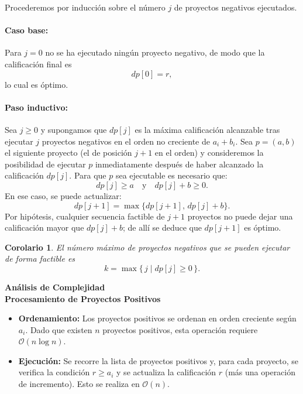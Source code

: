 ﻿\documentclass{article}
\theoremstyle{plain}
\newtheorem{corollary}{Corolario}
\theoremstyle{definition}
\begin{document}
Procederemos por inducción sobre el número \(j\) de proyectos negativos ejecutados.

\paragraph{Caso base:} Para \(j=0\) no se ha ejecutado ningún proyecto negativo, de modo que la calificación final es
\[
dp[0] = r,
\]
lo cual es óptimo.

\paragraph{Paso inductivo:} Sea \(j \ge 0\) y supongamos que \(dp[j]\) es la máxima calificación alcanzable tras ejecutar \(j\) proyectos negativos en el orden no creciente de \(a_i+b_i\). Sea \(p=(a,b)\) el siguiente proyecto (el de posición \(j+1\) en el orden) y consideremos la posibilidad de ejecutar \(p\) inmediatamente después de haber alcanzado la calificación \(dp[j]\).  
Para que \(p\) sea ejecutable es necesario que:
\[
dp[j] \ge a \quad \text{y} \quad dp[j] + b \ge 0.
\]
En ese caso, se puede actualizar:
\[
dp[j+1] = \max\{ dp[j+1],\, dp[j]+b \}.
\]
Por hipótesis, cualquier secuencia factible de \(j+1\) proyectos no puede dejar una calificación mayor que \(dp[j]+b\); de allí se deduce que \(dp[j+1]\) es óptimo.

\begin{corollary}
El número máximo de proyectos negativos que se pueden ejecutar de forma factible es
\[
k = \max\{\,j \mid dp[j] \ge 0\,\}.
\]
\end{corollary}

\textbf{Análisis de Complejidad}
\\

\textbf{Procesamiento de Proyectos Positivos}

\begin{itemize}
    \item \textbf{Ordenamiento:}  
    Los proyectos positivos se ordenan en orden creciente según \(a_i\). Dado que existen \(n\) proyectos positivos, esta operación requiere \(\mathcal{O}(n\log n)\).
    
    \item \textbf{Ejecución:}  
    Se recorre la lista de proyectos positivos y, para cada proyecto, se verifica la condición \(r \ge a_i\) y se actualiza la calificación \(r\) (más una operación de incremento). Esto se realiza en \(\mathcal{O}(n)\).
\end{itemize}
\end{document}
